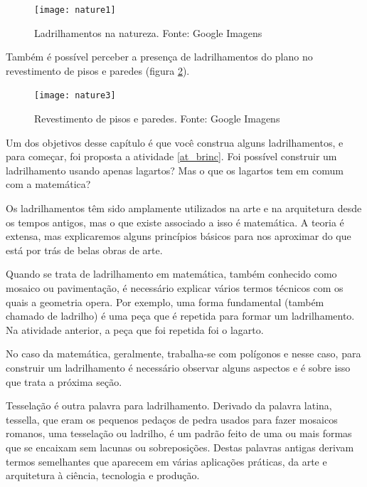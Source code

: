 \begin{figure}[H]
\centering
\texttt{[image: nature1]}
\label{natureza}
\caption{Ladrilhamentos na natureza. Fonte: Google Imagens}
\end{figure}

Também é possível perceber a presença de ladrilhamentos do plano no revestimento de pisos e paredes (figura \ref{natureza1}). 


\begin{figure}[H]
\centering
\texttt{[image: nature3]}
\label{natureza1}
\caption{Revestimento de pisos e paredes. Fonte: Google Imagens}
\end{figure}

Um dos objetivos desse capítulo é que você construa alguns ladrilhamentos, e para começar, foi proposta a atividade \ref{at_brinc}. Foi possível construir um ladrilhamento usando apenas lagartos?  Mas o que os lagartos tem em comum com a matemática? 

Os ladrilhamentos têm sido amplamente utilizados na arte e na arquitetura desde os tempos antigos, mas o que existe associado a isso é  matemática. A teoria é extensa, mas explicaremos alguns princípios básicos para nos aproximar do que está por trás de belas obras de arte. 

Quando se trata de ladrilhamento em matemática, também conhecido como mosaico ou pavimentação, é necessário explicar vários termos técnicos com os quais a geometria opera. Por exemplo, uma forma fundamental (também chamado de ladrilho) é uma peça que é repetida para formar um ladrilhamento. Na atividade anterior, a peça que foi repetida foi o lagarto.


No caso da matemática, geralmente, trabalha-se com polígonos e nesse caso, para construir um ladrilhamento é necessário observar alguns aspectos e é sobre isso que trata a próxima seção.


 \label{tess}

Tesselação é outra palavra para ladrilhamento. Derivado da palavra latina, tessella, que eram os pequenos pedaços de pedra usados para fazer mosaicos romanos, uma tesselação ou ladrilho, é um padrão feito de uma ou mais formas que se encaixam sem lacunas ou sobreposições.
Destas palavras antigas derivam termos semelhantes que aparecem em várias aplicações práticas, da arte e arquitetura à ciência, tecnologia e produção.

